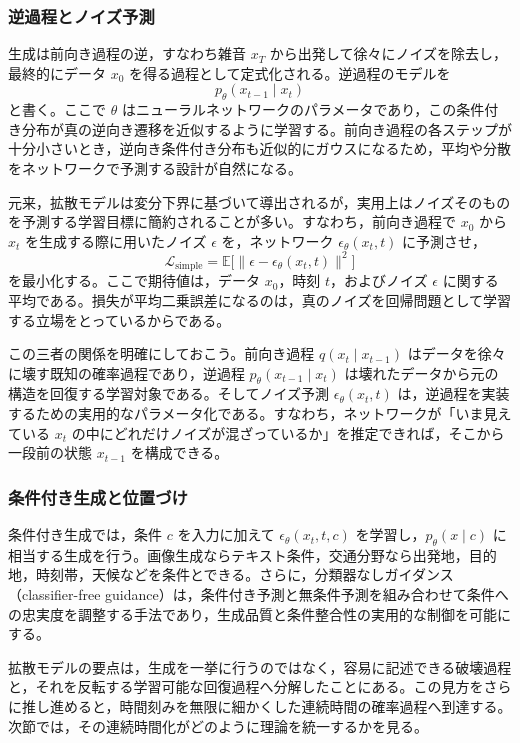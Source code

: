 \subsubsection{逆過程とノイズ予測}

生成は前向き過程の逆，すなわち雑音 \(x_T\) から出発して徐々にノイズを除去し，最終的にデータ \(x_0\) を得る過程として定式化される。逆過程のモデルを
\[
p_{\theta}(x_{t-1} \mid x_t)
\]
と書く。ここで \(\theta\) はニューラルネットワークのパラメータであり，この条件付き分布が真の逆向き遷移を近似するように学習する。前向き過程の各ステップが十分小さいとき，逆向き条件付き分布も近似的にガウスになるため，平均や分散をネットワークで予測する設計が自然になる。

元来，拡散モデルは変分下界に基づいて導出されるが，実用上はノイズそのものを予測する学習目標に簡約されることが多い。すなわち，前向き過程で \(x_0\) から \(x_t\) を生成する際に用いたノイズ \(\epsilon\) を，ネットワーク \(\epsilon_{\theta}(x_t,t)\) に予測させ，
\[
\mathcal{L}_{\text{simple}}
=
\mathbb{E}\bigl[\|\epsilon - \epsilon_{\theta}(x_t,t)\|^2\bigr]
\]
を最小化する。ここで期待値は，データ \(x_0\)，時刻 \(t\)，およびノイズ \(\epsilon\) に関する平均である。損失が平均二乗誤差になるのは，真のノイズを回帰問題として学習する立場をとっているからである。

この三者の関係を明確にしておこう。前向き過程 \(q(x_t \mid x_{t-1})\) はデータを徐々に壊す既知の確率過程であり，逆過程 \(p_{\theta}(x_{t-1}\mid x_t)\) は壊れたデータから元の構造を回復する学習対象である。そしてノイズ予測 \(\epsilon_{\theta}(x_t,t)\) は，逆過程を実装するための実用的なパラメータ化である。すなわち，ネットワークが「いま見えている \(x_t\) の中にどれだけノイズが混ざっているか」を推定できれば，そこから一段前の状態 \(x_{t-1}\) を構成できる。

\subsubsection{条件付き生成と位置づけ}

条件付き生成では，条件 \(c\) を入力に加えて \(\epsilon_{\theta}(x_t,t,c)\) を学習し，\(p_{\theta}(x \mid c)\) に相当する生成を行う。画像生成ならテキスト条件，交通分野なら出発地，目的地，時刻帯，天候などを条件とできる。さらに，分類器なしガイダンス（classifier-free guidance）は，条件付き予測と無条件予測を組み合わせて条件への忠実度を調整する手法であり，生成品質と条件整合性の実用的な制御を可能にする。

拡散モデルの要点は，生成を一挙に行うのではなく，容易に記述できる破壊過程と，それを反転する学習可能な回復過程へ分解したことにある。この見方をさらに推し進めると，時間刻みを無限に細かくした連続時間の確率過程へ到達する。次節では，その連続時間化がどのように理論を統一するかを見る。

